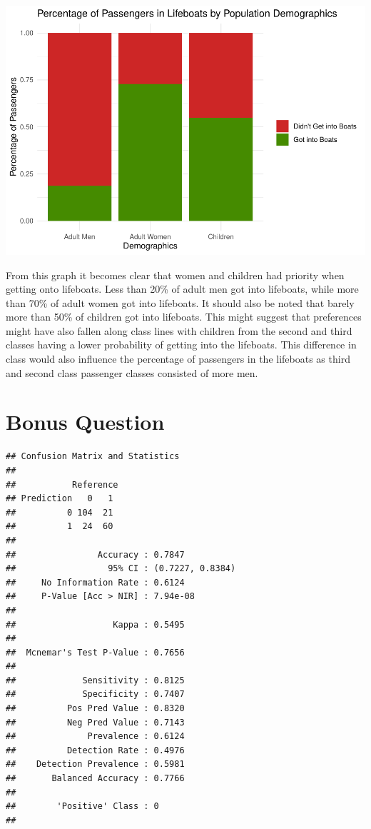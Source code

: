 \documentclass[
  11pt,
]{article}
\begin{document}
\includegraphics{README_files/figure-latex/unnamed-chunk-7-1.pdf}

From this graph it becomes clear that women and children had priority
when getting onto lifeboats. Less than 20\% of adult men got into
lifeboats, while more than 70\% of adult women got into lifeboats. It
should also be noted that barely more than 50\% of children got into
lifeboats. This might suggest that preferences might have also fallen
along class lines with children from the second and third classes having
a lower probability of getting into the lifeboats. This difference in
class would also influence the percentage of passengers in the lifeboats
as third and second class passenger classes consisted of more men.

\hypertarget{bonus-question}{%
\section{Bonus Question}\label{bonus-question}}

\begin{verbatim}
## Confusion Matrix and Statistics
## 
##           Reference
## Prediction   0   1
##          0 104  21
##          1  24  60
##                                           
##                Accuracy : 0.7847          
##                  95% CI : (0.7227, 0.8384)
##     No Information Rate : 0.6124          
##     P-Value [Acc > NIR] : 7.94e-08        
##                                           
##                   Kappa : 0.5495          
##                                           
##  Mcnemar's Test P-Value : 0.7656          
##                                           
##             Sensitivity : 0.8125          
##             Specificity : 0.7407          
##          Pos Pred Value : 0.8320          
##          Neg Pred Value : 0.7143          
##              Prevalence : 0.6124          
##          Detection Rate : 0.4976          
##    Detection Prevalence : 0.5981          
##       Balanced Accuracy : 0.7766          
##                                           
##        'Positive' Class : 0               
## 
\end{verbatim}
\end{document}
